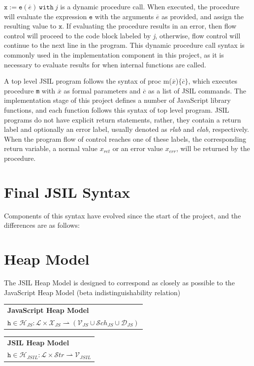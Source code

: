 \documentclass[a4paper,11pt,twoside]{report}
\begin{document}
$\mathtt{x} := \mathtt{e}(\overline{e})\ \mathtt{with}\ \textit{j}$ is a dynamic procedure call. When executed, the procedure will evaluate the expression $\mathtt{e}$ with the arguments $\overline{e}$ as provided, and assign the resulting value to $\mathtt{x}$. If evaluating the procedure results in an error, then flow control will proceed to the code block labeled by \textit{j}, otherwise, flow control will continue to the next line in the program. This dynamic procedure call syntax is commonly used in the implementation component in this project, as it is necessary to evaluate results for when internal functions are called.

A top level JSIL program follows the syntax of proc m($\overline{x}$)$\{\overline{c}\}$, which executes procedure \texttt{m} with $\overline{x}$ as formal parameters and $\overline{c}$ as a list of JSIL commands. The implementation stage of this project defines a number of JavaScript library functions, and each function follows this syntax of top level program. JSIL programs do not have explicit return statements, rather, they contain a return label and optionally an error label, usually denoted as \textit{rlab} and \textit{elab}, respectively. When the program flow of control reaches one of these labels, the corresponding return variable, a normal value $x_{ret}$ or an error value $x_{err}$, will be returned by the procedure.

\section{Final JSIL Syntax}
Components of this syntax have evolved since the start of the project, and the differences are as follows:

\section{Heap Model}
The JSIL Heap Model is designed to correspond as closely as possible to the JavaScript Heap Model (beta indistinguishability relation)


\begin{center}
\begin{tabular}{p{9cm}} \hline
\textbf{JavaScript Heap Model} \\
$\texttt{h} \in \mathcal{H}_{JS} : \mathcal{L} \times \mathcal{X}_{JS} \rightharpoonup (\mathcal{V}_{JS} \cup \mathcal{S}ch_{JS} \cup \mathcal{D}_{JS})$  \\ \hline
\end{tabular}
\vspace{0.3cm}
\begin{tabular}{p{9cm}} \hline
\textbf{JSIL Heap Model} \\
$\texttt{h} \in \mathcal{H}_{JSIL} : \mathcal{L} \times \mathcal{S}tr \rightharpoonup \mathcal{V}_{JSIL}  $  \\ \hline
\end{tabular}
\end{center}
\end{document}
